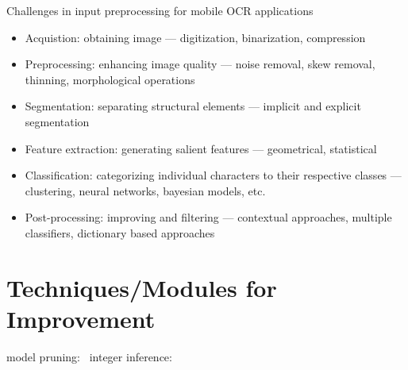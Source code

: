 Challenges in input preprocessing for mobile OCR applications~\cite{sourvanos_challenges_2018}
\begin{itemize}
    \item Acquistion: obtaining image --- digitization, binarization, compression
    \item Preprocessing: enhancing image quality --- noise removal, skew removal, thinning,
        morphological operations
    \item Segmentation: separating structural elements --- implicit and explicit segmentation
    \item Feature extraction: generating salient features --- geometrical, statistical
    \item Classification: categorizing individual characters to their respective classes --- clustering,
        neural networks, bayesian models, etc.
    \item Post-processing: improving and filtering --- contextual approaches, multiple classifiers, dictionary based approaches
\end{itemize}


\section{Techniques/Modules for Improvement}

model pruning:~\cite{niu_26ms_2019}
integer inference:~\cite{ignatov_ai_2019}

